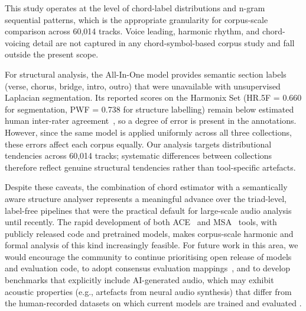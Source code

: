 \documentclass{article}
\begin{document}
This study operates at the level of chord-label distributions and n-gram sequential patterns, which is the appropriate granularity for corpus-scale comparison across 60,014 tracks. Voice leading, harmonic rhythm, and chord-voicing detail are not captured in any chord-symbol-based corpus study and fall outside the present scope.

For structural analysis, the All-In-One model provides semantic section labels (verse, chorus, bridge, intro, outro) that were unavailable with unsupervised Laplacian segmentation. Its reported scores on the Harmonix Set (HR.5F = 0.660 for segmentation, PWF = 0.738 for structure labelling) remain below estimated human inter-rater agreement~\citep{nieto2020audio}, so a degree of error is present in the annotations. However, since the same model is applied uniformly across all three collections, these errors affect each corpus equally. Our analysis targets distributional tendencies across 60,014 tracks; systematic differences between collections therefore reflect genuine structural tendencies rather than tool-specific artefacts.

Despite these caveats, the combination of chord estimator with a semantically aware structure analyser represents a meaningful advance over the triad-level, label-free pipelines that were the practical default for large-scale audio analysis until recently. The rapid development of both ACE~\citep{poltronieri2025discord, park2019bi, mcfee2017structured, jiang2019large, waseem2025chordformer} and MSA~\citep{taejun2023allinone, wang2022catch, buisson2024using, peeters2023self} tools, with publicly released code and pretrained models, makes corpus-scale harmonic and formal analysis of this kind increasingly feasible. For future work in this area, we would encourage the community to continue prioritising open release of models and evaluation code, to adopt consensus evaluation mappings~\citep{pauwels2013evaluating}, and to develop benchmarks that explicitly include AI-generated audio, which may exhibit acoustic properties (e.g., artefacts from neural audio synthesis) that differ from the human-recorded datasets on which current models are trained and evaluated \citep{cros2025ai}.



\end{document}
